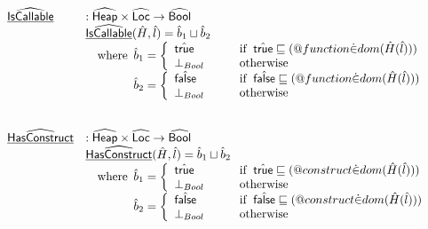 \[\begin{array}{ll}
\ahf{IsCallable} & : \aHeap \times \aLoc \rightarrow \abs{Bool} \\
& \ahf{IsCallable}(\hat{H},\hat{l})
  = \hat{b}_1\sqcup\hat{b}_2 \\
& \quad\wherec{
  \hat{b}_1 = 
    \left\{
      \begin{array}{l@{\quad\quad\quad}l}
        \atrue &\ifc{\atrue\sqsubseteq(\varprop{function} \dot{\in} dom(\hat{H}(\hat{l})))}\\
        \bot_{Bool} &\owc
      \end{array}
    \right.\\
  \hat{b}_2 = 
    \left\{
      \begin{array}{l@{\quad\quad\quad}l}
        \afalse &\ifc{\afalse\sqsubseteq(\varprop{function} \dot{\in} dom(\hat{H}(\hat{l})))}\\
        \bot_{Bool} &\owc
      \end{array}
    \right.\\
  }\\\\
\\

\ahf{HasConstruct} & : \aHeap \times \aLoc \rightarrow \abs{Bool} \\
& \ahf{HasConstruct}(\hat{H},\hat{l})
  = \hat{b}_1\sqcup\hat{b}_2 \\
& \quad\wherec{
  \hat{b}_1 = 
    \left\{
      \begin{array}{l@{\quad\quad\quad}l}
        \atrue &\ifc{\atrue\sqsubseteq(\varprop{construct} \dot{\in} dom(\hat{H}(\hat{l})))}\\
        \bot_{Bool} &\owc
      \end{array}
    \right.\\
  \hat{b}_2 = 
    \left\{
      \begin{array}{l@{\quad\quad\quad}l}
        \afalse &\ifc{\afalse\sqsubseteq(\varprop{construct} \dot{\in} dom(\hat{H}(\hat{l})))}\\
        \bot_{Bool} &\owc
      \end{array}
    \right.\\

  }\\\\
\end{array}
\]
